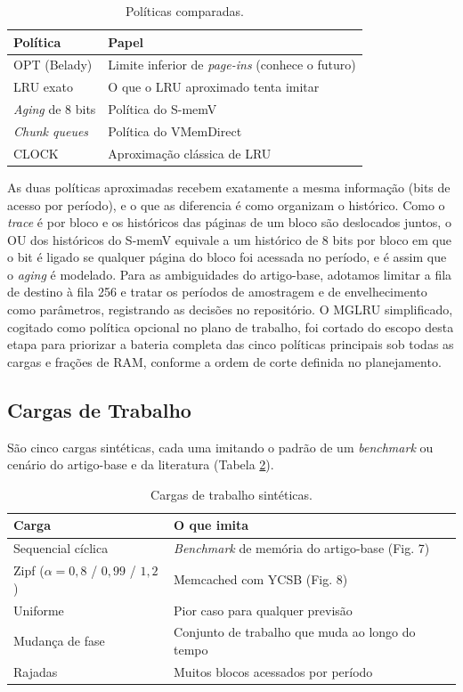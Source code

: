 \documentclass[12pt]{article}
\begin{document}
\begin{table}[h]
\centering
\caption{Políticas comparadas.}
\label{tab:politicas}
\begin{tabular}{ll}
\toprule
Política & Papel \\
\midrule
OPT (Belady) & Limite inferior de \textit{page-ins} (conhece o futuro) \\
LRU exato & O que o LRU aproximado tenta imitar \\
\textit{Aging} de 8 bits & Política do S-memV \cite{suetake2018smemv} \\
\textit{Chunk queues} & Política do VMemDirect \cite{muraoka2023vmemdirect} \\
CLOCK & Aproximação clássica de LRU \\
\bottomrule
\end{tabular}
\end{table}

As duas políticas aproximadas recebem exatamente a mesma informação (bits de acesso por período), e o que as diferencia é como organizam o histórico. Como o \textit{trace} é por bloco e os históricos das páginas de um bloco são deslocados juntos, o OU dos históricos do S-memV equivale a um histórico de 8 bits por bloco em que o bit é ligado se qualquer página do bloco foi acessada no período, e é assim que o \textit{aging} é modelado. Para as ambiguidades do artigo-base, adotamos limitar a fila de destino à fila 256 e tratar os períodos de amostragem e de envelhecimento como parâmetros, registrando as decisões no repositório. O MGLRU simplificado, cogitado como política opcional no plano de trabalho, foi cortado do escopo desta etapa para priorizar a bateria completa das cinco políticas principais sob todas as cargas e frações de RAM, conforme a ordem de corte definida no planejamento.

\subsection{Cargas de Trabalho}

São cinco cargas sintéticas, cada uma imitando o padrão de um \textit{benchmark} ou cenário do artigo-base e da literatura (Tabela \ref{tab:cargas}).

\begin{table}[h]
\centering
\caption{Cargas de trabalho sintéticas.}
\label{tab:cargas}
\begin{tabular}{ll}
\toprule
Carga & O que imita \\
\midrule
Sequencial cíclica & \textit{Benchmark} de memória do artigo-base (Fig. 7) \\
Zipf ($\alpha=0{,}8$ / $0{,}99$ / $1{,}2$) & Memcached com YCSB (Fig. 8) \\
Uniforme & Pior caso para qualquer previsão \\
Mudança de fase & Conjunto de trabalho que muda ao longo do tempo \\
Rajadas & Muitos blocos acessados por período \\
\bottomrule
\end{tabular}
\end{table}
\end{document}
